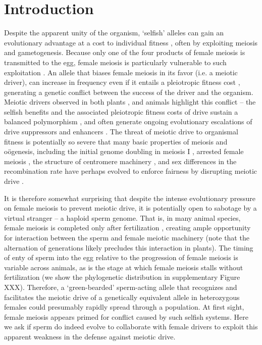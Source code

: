 \documentclass[12pt,letterpaper]{article}
\newcommand{\gc}[1]{{ \color{red} #1}}
\begin{document}
\section*{Introduction}
Despite the apparent unity of the organism, `selfish' alleles can
gain an evolutionary advantage at a cost to  individual fitness
\citep{Burt2006}, often by exploiting meiosis and gametogenesis.
Because only one of the four products of female meiosis is transmitted to the egg, female meiosis is particularly vulnerable to such exploitation \citep{Sandler1957,Pardo-ManuelDeVillena2001a}. 
An allele that biases female meiosis in its favor (i.e. a meiotic driver), can increase in frequency even if it entails a pleiotropic fitness cost \citep{Prout1973}, generating a genetic conflict between the success of the driver and the organism.
Meiotic drivers observed in both plants
\citep{Buckler1999,Fishman2005,Fishman2008}, and animals
\citep{Agulnik1990,Wu2005,Pardo-ManuelDeVillena2001c} highlight this
conflict -- the selfish benefits and the associated
pleiotropic fitness costs of drive sustain a balanced polymorphism
\citep{Prout1973}, 
and often generate ongoing evolutionary escalations of drive suppressors and enhancers \citep{Dawe1996,Fishman2008}. 
The threat of meiotic drive to organismal fitness is potentially so
severe that many basic properties of
meiosis and o\"{o}genesis, including the initial genome doubling in
meiosis I \citep{Haig1991}, arrested female meiosis
\citep{Mira1998}, the structure of centromere machinery \citep{Malik2002a,Malik2009}, and sex differences in the recombination rate \citep{Haig2010,Brandvain2012} 
have perhaps evolved to enforce fairness by disrupting meiotic drive \citep{Rice2013}. \newline 

It is therefore somewhat surprising that despite the intense evolutionary pressure on female meiosis to prevent meiotic drive, 
it is potentially open to sabotage by a virtual stranger -- a haploid sperm genome.
That is, in many animal species, female meiosis is completed only
after fertilization \citep{Masui_book}, creating ample opportunity for interaction between the sperm and
	female meiotic machinery (note that the alternation of generations
	likely precludes this interaction in plants). 
\gc{The timing of enty of sperm into the egg relative to the
  progression of female meiosis is variable across animals, as is the
  stage at which female meiosis
  stalls without fertilization (we show the phylogenetic distribution
  in supplementary Figure XXX).}
Therefore, a `green-bearded' \citep{Gardner2010} sperm-acting allele that recognizes and facilitates the meiotic drive of a genetically equivalent allele in heterozygous females 
     could presumably rapidly spread through a population. 
At first sight, female meiosis appears primed for conflict caused by such selfish systems. 
Here we ask if sperm do indeed evolve to collaborate with female drivers to exploit this 
	apparent weakness in the defense against meiotic drive. \newline 
\end{document}
